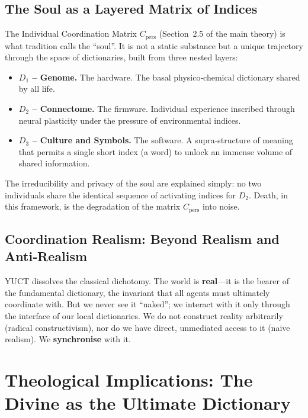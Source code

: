 \documentclass[12pt,a4paper]{article}
\begin{document}
	\subsection{The Soul as a Layered Matrix of Indices}
	
	The Individual Coordination Matrix \(C_{\mathrm{pers}}\) (Section~2.5 of the main theory) is what tradition calls the ``soul''. It is not a static substance but a unique trajectory through the space of dictionaries, built from three nested layers:
	
	\begin{itemize}[leftmargin=*]
		\item \textbf{\(D_1\) – Genome.} The hardware. The basal physico‑chemical dictionary shared by all life.
		\item \textbf{\(D_2\) – Connectome.} The firmware. Individual experience inscribed through neural plasticity under the pressure of environmental indices.
		\item \textbf{\(D_3\) – Culture and Symbols.} The software. A supra‑structure of meaning that permits a single short index (a word) to unlock an immense volume of shared information.
	\end{itemize}
	
	The irreducibility and privacy of the soul are explained simply: no two individuals share the identical sequence of activating indices for \(D_2\). Death, in this framework, is the degradation of the matrix \(C_{\mathrm{pers}}\) into noise.
	
	\subsection{Coordination Realism: Beyond Realism and Anti‑Realism}
	
	YUCT dissolves the classical dichotomy. The world is \textbf{real}---it is the bearer of the fundamental dictionary, the invariant that all agents must ultimately coordinate with. But we never see it ``naked''; we interact with it only through the interface of our local dictionaries. We do not construct reality arbitrarily (radical constructivism), nor do we have direct, unmediated access to it (naive realism). We \textbf{synchronise} with it.
	
	\section{Theological Implications: The Divine as the Ultimate Dictionary}
	\label{sec:theology}
	
\end{document}
